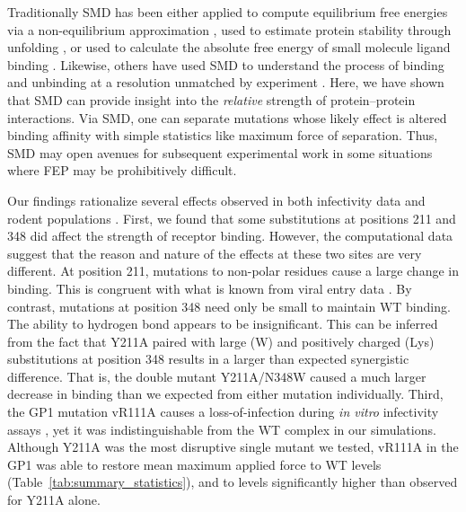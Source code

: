 \documentclass[12pt]{article}
\begin{document}
Traditionally SMD has been either applied to compute equilibrium free energies via a non-equilibrium approximation \citep{Park2003,Park2004,Giorgino2011}, used to estimate protein stability through unfolding \citep{Lu1999}, or used to calculate the absolute free energy of small molecule ligand binding \citep{Dixit2001}. Likewise, others have used SMD to understand the process of binding and unbinding at a resolution unmatched by experiment \citep{Cuendet2011,Giorgino2011}. Here, we have shown that SMD can provide insight into the \textit{relative} strength of protein--protein interactions. Via SMD, one can separate mutations whose likely effect is altered binding affinity with simple statistics like maximum force of separation. Thus, SMD may open avenues for subsequent experimental work in some situations where FEP may be prohibitively difficult.

Our findings rationalize several effects observed in both infectivity data and rodent populations \citep{Rad2008,Rad20111}. First, we found that some substitutions at positions 211 and 348 did affect the strength of receptor binding. However, the computational data suggest that the reason and nature of the effects at these two sites are very different. At position 211, mutations to non-polar residues cause a large change in binding. This is congruent with what is known from viral entry data \citep{Rad2008,Rad20111}. By contrast, mutations at position 348 need only be small to maintain WT binding. The ability to hydrogen bond appears to be insignificant. This can be inferred from the fact that Y211A paired with large (W) and positively charged (Lys) substitutions at position 348 results in a larger than expected synergistic difference. That is, the double mutant Y211A/N348W caused a much larger decrease in binding than we expected from either mutation individually. Third, the GP1 mutation vR111A causes a loss-of-infection during \textit{in vitro} infectivity assays \citep{Rad20112}, yet it was indistinguishable from the WT complex in our simulations. Although Y211A was the most disruptive single mutant we tested, vR111A in the GP1 was able to restore mean maximum applied force to WT levels (Table~\ref{tab:summary_statistics}), and to levels significantly higher than observed for Y211A alone.
\end{document}
